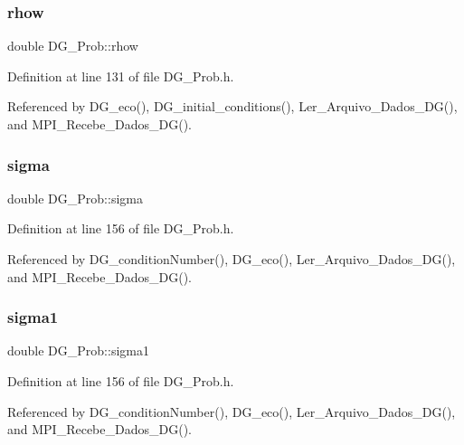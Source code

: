 \subsubsection{\texorpdfstring{rhow}{rhow}}
{\footnotesize\ttfamily double D\+G\+\_\+\+Prob\+::rhow\hspace{0.3cm}{\ttfamily [private]}}



Definition at line 131 of file D\+G\+\_\+\+Prob.\+h.



Referenced by D\+G\+\_\+eco(), D\+G\+\_\+initial\+\_\+conditions(), Ler\+\_\+\+Arquivo\+\_\+\+Dados\+\_\+\+D\+G(), and M\+P\+I\+\_\+\+Recebe\+\_\+\+Dados\+\_\+\+D\+G().

\mbox{\label{classDG__Prob_a93197609da7dbef6707e58bdc32b8d12}} 
\subsubsection{\texorpdfstring{sigma}{sigma}}
{\footnotesize\ttfamily double D\+G\+\_\+\+Prob\+::sigma\hspace{0.3cm}{\ttfamily [private]}}



Definition at line 156 of file D\+G\+\_\+\+Prob.\+h.



Referenced by D\+G\+\_\+condition\+Number(), D\+G\+\_\+eco(), Ler\+\_\+\+Arquivo\+\_\+\+Dados\+\_\+\+D\+G(), and M\+P\+I\+\_\+\+Recebe\+\_\+\+Dados\+\_\+\+D\+G().

\mbox{\label{classDG__Prob_aa75a7526410f7d21514bf500c01096cd}} 
\subsubsection{\texorpdfstring{sigma1}{sigma1}}
{\footnotesize\ttfamily double D\+G\+\_\+\+Prob\+::sigma1\hspace{0.3cm}{\ttfamily [private]}}



Definition at line 156 of file D\+G\+\_\+\+Prob.\+h.



Referenced by D\+G\+\_\+condition\+Number(), D\+G\+\_\+eco(), Ler\+\_\+\+Arquivo\+\_\+\+Dados\+\_\+\+D\+G(), and M\+P\+I\+\_\+\+Recebe\+\_\+\+Dados\+\_\+\+D\+G().

